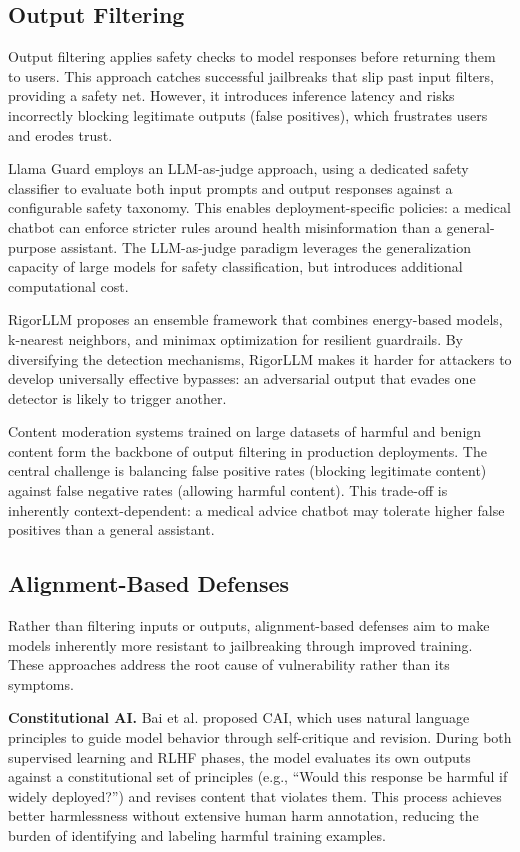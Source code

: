 \documentclass[conference]{IEEEtran}
\begin{document}
\subsection{Output Filtering}

Output filtering applies safety checks to model responses before returning them to users. This approach catches successful jailbreaks that slip past input filters, providing a safety net. However, it introduces inference latency and risks incorrectly blocking legitimate outputs (false positives), which frustrates users and erodes trust.

Llama Guard \cite{inan2023llamaguard} employs an LLM-as-judge approach, using a dedicated safety classifier to evaluate both input prompts and output responses against a configurable safety taxonomy. This enables deployment-specific policies: a medical chatbot can enforce stricter rules around health misinformation than a general-purpose assistant. The LLM-as-judge paradigm leverages the generalization capacity of large models for safety classification, but introduces additional computational cost.

RigorLLM \cite{yuan2024rigorllm} proposes an ensemble framework that combines energy-based models, k-nearest neighbors, and minimax optimization for resilient guardrails. By diversifying the detection mechanisms, RigorLLM makes it harder for attackers to develop universally effective bypasses: an adversarial output that evades one detector is likely to trigger another.

Content moderation systems trained on large datasets of harmful and benign content form the backbone of output filtering in production deployments. The central challenge is balancing false positive rates (blocking legitimate content) against false negative rates (allowing harmful content). This trade-off is inherently context-dependent: a medical advice chatbot may tolerate higher false positives than a general assistant.

\subsection{Alignment-Based Defenses}

Rather than filtering inputs or outputs, alignment-based defenses aim to make models inherently more resistant to jailbreaking through improved training. These approaches address the root cause of vulnerability rather than its symptoms.

\textbf{Constitutional AI.} Bai et al. \cite{bai2022constitutional} proposed CAI, which uses natural language principles to guide model behavior through self-critique and revision. During both supervised learning and RLHF phases, the model evaluates its own outputs against a constitutional set of principles (e.g., ``Would this response be harmful if widely deployed?'') and revises content that violates them. This process achieves better harmlessness without extensive human harm annotation, reducing the burden of identifying and labeling harmful training examples.
\end{document}
